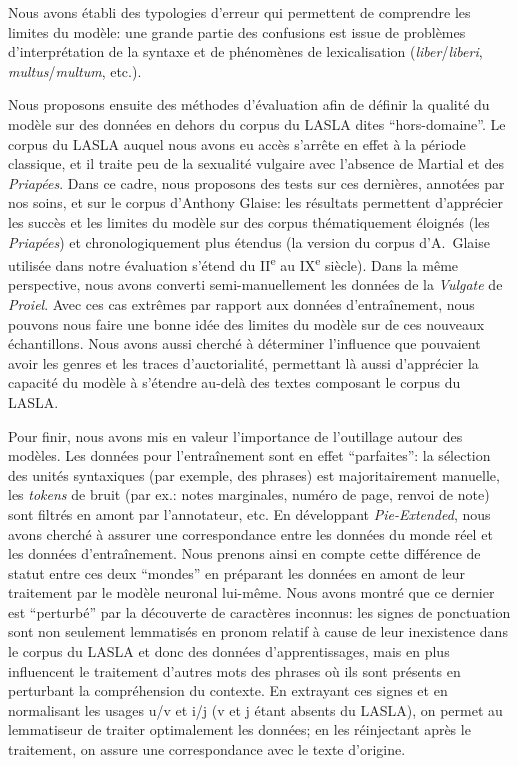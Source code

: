 Nous avons établi des typologies d'erreur qui permettent de comprendre les limites du modèle: une grande partie des confusions est issue de problèmes d'interprétation de la syntaxe et de phénomènes de lexicalisation (\textit{liber}/\textit{liberi}, \textit{multus}/\textit{multum}, etc.).

Nous proposons ensuite des méthodes d'évaluation afin de définir la qualité du modèle sur des données en dehors du corpus du LASLA dites \enquote{hors-domaine}. Le corpus du LASLA auquel nous avons eu accès s'arrête en effet à la période classique, et il traite peu de la sexualité vulgaire avec l'absence de Martial et des \textit{Priapées}. Dans ce cadre, nous proposons des tests sur ces dernières, annotées par nos soins, et sur le corpus d'Anthony Glaise: les résultats permettent d'apprécier les succès et les limites du modèle sur des corpus thématiquement éloignés (les \textit{Priapées}) et chronologiquement plus étendus (la version du corpus d'A.~Glaise utilisée dans notre évaluation s'étend du II\textsuperscript{e} au IX\textsuperscript{e} siècle). Dans la même perspective, nous avons converti semi-manuellement les données de la \textit{Vulgate} de \textit{Proiel}. Avec ces cas extrêmes par rapport aux données d'entraînement, nous pouvons nous faire une bonne idée des limites du modèle sur de ces nouveaux échantillons. Nous avons aussi cherché à déterminer l'influence que pouvaient avoir les genres et les traces d'auctorialité, permettant là aussi d'apprécier la capacité du modèle à s'étendre au-delà des textes composant le corpus du LASLA. 

Pour finir, nous avons mis en valeur l'importance de l'outillage autour des modèles. Les données pour l'entraînement sont en effet \enquote{parfaites}: la sélection des unités syntaxiques (par exemple, des phrases) est majoritairement manuelle, les \textit{tokens} de bruit (par ex.: notes marginales, numéro de page, renvoi de note) sont filtrés en amont par l'annotateur, etc. En développant \textit{Pie-Extended}, nous avons cherché à assurer une correspondance entre les données du monde réel et les données d'entraînement. Nous prenons ainsi en compte cette différence de statut entre ces deux \enquote{mondes} en préparant les données en amont de leur traitement par le modèle neuronal lui-même. Nous avons montré que ce dernier est \enquote{perturbé} par la découverte de caractères inconnus: les signes de ponctuation sont non seulement lemmatisés en pronom relatif à cause de leur inexistence dans le corpus du LASLA et donc des données d'apprentissages, mais en plus influencent le traitement d'autres mots des phrases où ils sont présents en perturbant la compréhension du contexte. En extrayant ces signes et en normalisant les usages u/v et i/j (v et j étant absents du LASLA), on permet au lemmatiseur de traiter optimalement les données; en les réinjectant après le traitement, on assure une correspondance avec le texte d'origine.

